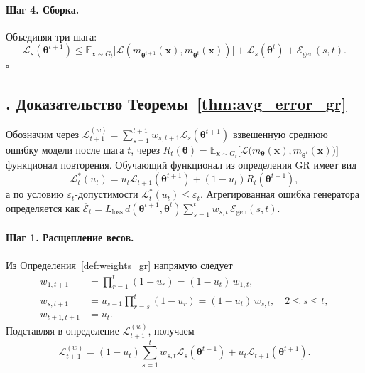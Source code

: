 \documentclass[a4paper,14pt,oneside,openany]{extarticle}
\newcommand{\bx}{\mathbf{x}}
\newcommand{\cL}{\mathcal{L}}
\newcommand{\cE}{\mathcal{E}}
\newcommand{\bbE}{\mathbb{E}}
\newcommand{\btheta}{\boldsymbol{\theta}}
\begin{document}
\paragraph{Шаг 4. Сборка.} Объединяя три шага:
\[
    \cL_s(\btheta^{t+1}) \le \bbE_{\bx \sim G_t}\bigl[\cL(m_{\btheta^{t+1}}(\bx), m_{\btheta^t}(\bx))\bigr] + \cL_s(\btheta^t) + \cE_{\mathrm{gen}}(s, t).
\]
\hfill$\square$

\subsection*{\theappthm. Доказательство Теоремы~\ref{thm:avg_error_gr}}\label{app:proof_avg_error}

Обозначим через $\cL^{(w)}_{t+1} = \sum_{s=1}^{t+1} w_{s, t+1} \cL_s(\btheta^{t+1})$ взвешенную среднюю ошибку модели после шага $t$, через $R_t(\btheta) = \bbE_{\bx \sim G_t}\bigl[\cL\bigl(m_{\btheta}(\bx), m_{\btheta^t}(\bx)\bigr)\bigr]$ функционал повторения. Обучающий функционал из определения GR имеет вид
\begin{equation}
    \cL^*_t(u_t) = u_t \cL_{t+1}(\btheta^{t+1}) + (1 - u_t) R_t(\btheta^{t+1}),
    \label{eq:app_Lstar}
\end{equation}
а по условию $\varepsilon_t$-допустимости $\cL^*_t(u_t) \le \varepsilon_t$. Агрегированная ошибка генератора определяется как $\overline{\mathcal E}_t = L_{\text{loss}}\, d(\btheta^{t+1}, \btheta^t) \sum_{s=1}^t w_{s, t}\, \cE_{\mathrm{gen}}(s, t)$.

\paragraph{Шаг 1. Расщепление весов.} Из Определения~\ref{def:weights_gr} напрямую следует
\begin{align*}
    w_{1, t+1} &= \prod_{r=1}^{t}(1 - u_r) = (1 - u_t)\, w_{1, t}, \\
    w_{s, t+1} &= u_{s-1}\prod_{r=s}^{t}(1 - u_r) = (1 - u_t)\, w_{s, t}, \quad 2 \le s \le t, \\
    w_{t+1, t+1} &= u_t.
\end{align*}
Подставляя в определение $\cL^{(w)}_{t+1}$, получаем
\begin{equation}
    \cL^{(w)}_{t+1} = (1 - u_t)\sum_{s=1}^{t} w_{s, t} \cL_s(\btheta^{t+1}) + u_t \cL_{t+1}(\btheta^{t+1}).
    \label{eq:app_recur_L}
\end{equation}
\end{document}
